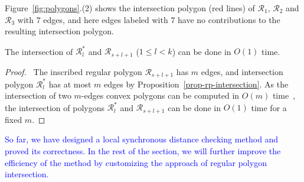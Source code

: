 Figure~\ref{fig:polygons}.(2) shows the intersection polygon (red lines) of $\mathcal{R}_1$, $\mathcal{R}_2$ and $\mathcal{R}_3$ with $7$ edges, and here edges labeled with $7$ have no contributions to the resulting intersection polygon.

\begin{prop}
\label{prop-cpi-time}
The intersection of $\mathcal{R}^*_l$ and $\mathcal{R}_{s+l+1}$ ($ 1\le l< k$) can be done in $O(1)$
time.
\end{prop}

\begin{proof}\
The inscribed regular polygon $\mathcal{R}_{s+l+1}$ has $m$ edges, and intersection polygon $\mathcal{R}^*_l$ has at most $m$ edges by Proposition~\ref{prop-rp-intersection}.
As the intersection of two $m$-edges convex polygons can be computed in $O(m)$ time~\cite{ORourke:Intersection}, the intersection of polygons $\mathcal{R}^*_l$ and $\mathcal{R}_{s+l+1}$ can be done in $O(1)$ time for a fixed $m$. \eop
\end{proof}


\textcolor{blue}{So far, we have designed a local synchronous distance checking method and proved its correctness. In the rest of the section, we will further improve the efficiency of the method by customizing the approach of regular polygon intersection.}





